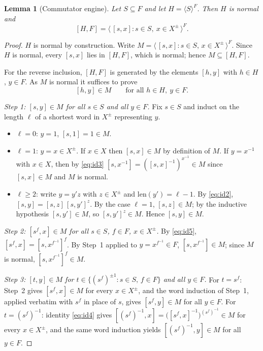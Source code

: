 \documentclass{amsart}
\newtheorem{lemma}{Lemma}
\theoremstyle{definition}
\theoremstyle{remark}
\begin{document}
\begin{lemma}[Commutator engine]\label{lem:engine}
Let $S\subseteq F$ and let $H=\langle S\rangle^{F}$. Then $H$ is normal and
\begin{equation}\label{eq:engine}
[H,F]=\big\langle\,[s,x] : s\in S,\ x\in X^{\pm}\,\big\rangle^{F}.
\end{equation}
\end{lemma}

\begin{proof}
$H$ is normal by construction. Write
$M=\langle\,[s,x]:s\in S,\,x\in X^{\pm}\,\rangle^{F}$. Since $H$ is normal, every
$[s,x]$ lies in $[H,F]$, which is normal; hence $M\subseteq[H,F]$.

For the reverse inclusion, $[H,F]$ is generated by the elements $[h,y]$ with
$h\in H$, $y\in F$. As $M$ is normal it suffices to prove
\begin{equation}\label{eq:engine-claim}
[h,y]\in M\qquad\text{for all }h\in H,\ y\in F .
\end{equation}

\smallskip
\emph{Step 1: $[s,y]\in M$ for all $s\in S$ and all $y\in F$.}
Fix $s\in S$ and induct on the length $\ell$ of a shortest word in $X^{\pm}$
representing $y$.
\begin{itemize}
\item $\ell=0$: $y=1$, $[s,1]=1\in M$.
\item $\ell=1$: $y=x\in X^{\pm}$. If $x\in X$ then $[s,x]\in M$ by definition of
$M$. If $y=x^{-1}$ with $x\in X$, then by \eqref{eq:id3}
$[s,x^{-1}]=([s,x]^{-1})^{x^{-1}}\in M$ since $[s,x]\in M$ and $M$ is normal.
\item $\ell\ge2$: write $y=y'z$ with $z\in X^{\pm}$ and $\mathrm{len}(y')=\ell-1$.
By \eqref{eq:id2}, $[s,y]=[s,z]\,[s,y']^{z}$. By the case $\ell=1$, $[s,z]\in M$;
by the inductive hypothesis $[s,y']\in M$, so $[s,y']^{z}\in M$. Hence
$[s,y]\in M$.
\end{itemize}

\smallskip
\emph{Step 2: $[s^{f},x]\in M$ for all $s\in S$, $f\in F$, $x\in X^{\pm}$.}
By \eqref{eq:id5}, $[s^{f},x]=[s,x^{f^{-1}}]^{f}$. By Step~1 applied to
$y=x^{f^{-1}}\in F$, $[s,x^{f^{-1}}]\in M$; since $M$ is normal,
$[s,x^{f^{-1}}]^{f}\in M$.

\smallskip
\emph{Step 3: $[t,y]\in M$ for $t\in\{(s^{f})^{\pm1}:s\in S,\,f\in F\}$ and all
$y\in F$.}
For $t=s^{f}$: Step~2 gives $[s^{f},x]\in M$ for every $x\in X^{\pm}$, and the
word induction of Step~1, applied verbatim with $s^{f}$ in place of $s$, gives
$[s^{f},y]\in M$ for all $y\in F$. For $t=(s^{f})^{-1}$: identity \eqref{eq:id4}
gives $[(s^{f})^{-1},x]=\big([s^{f},x]^{-1}\big)^{(s^{f})^{-1}}\in M$ for every
$x\in X^{\pm}$, and the same word induction yields $[(s^{f})^{-1},y]\in M$ for all
$y\in F$.


\end{proof}
\end{document}
